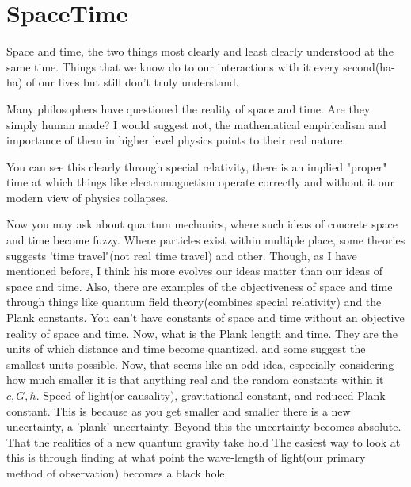\section{SpaceTime}
\par Space and time, the two things most clearly and least clearly understood at the same time. Things that we know do to our interactions with it every second(ha-ha) of our lives but still don't truly understand.
\par Many philosophers have questioned the reality of space and time. Are they simply human made? I would suggest not, the mathematical empiricalism and importance of them in higher level physics points to their real nature. 
\par You can see this clearly through special relativity, there is an implied "proper" time at which things like electromagnetism operate correctly and without it our modern view of physics collapses.
\par Now you may ask about quantum mechanics, where such ideas of concrete space and time become fuzzy. Where particles exist within multiple place, some theories suggests 'time travel"(not real time travel) and other. Though, as I have mentioned before, I think his more evolves our ideas matter than our ideas of space and time. Also, there are examples of the objectiveness of space and time through things like quantum field theory(combines special relativity) and the Plank constants. You can't have constants of space and time without an objective reality of space and time. Now, what is the Plank length and time. They are the units of which distance and time become quantized, and some suggest the smallest units possible. Now, that seems like an odd idea, especially considering how much smaller it is that anything real and the random constants within it $c,G,\hbar$. Speed of light(or causality), gravitational constant, and reduced Plank constant. This is because as you get smaller and smaller there is a new uncertainty, a 'plank' uncertainty. Beyond this the uncertainty becomes absolute. That the realities of a new quantum gravity take hold The easiest way to look at this is through finding at what point the wave-length of light(our primary method of observation) becomes a black hole. 
